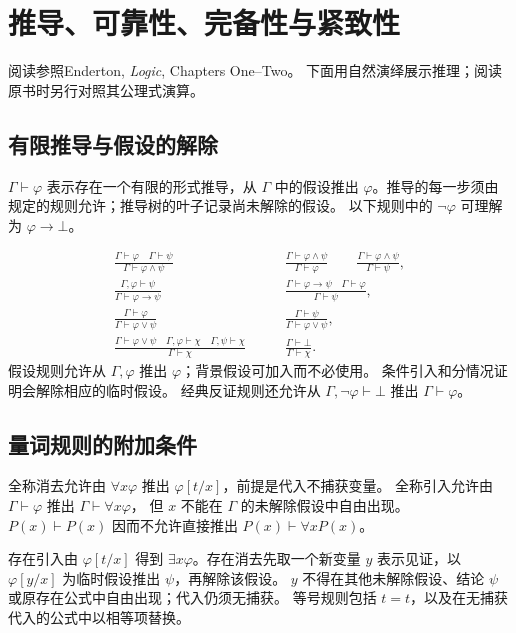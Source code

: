 \chapter{推导、可靠性、完备性与紧致性}
\begin{qlnote}{阅读参照}Enderton, \emph{Logic}, Chapters One--Two。
下面用自然演绎展示推理；阅读原书时另行对照其公理式演算。\end{qlnote}

\section{有限推导与假设的解除}
\(\Gamma\vdash\varphi\) 表示存在一个有限的形式推导，从 \(\Gamma\) 中的假设推出
\(\varphi\)。推导的每一步须由规定的规则允许；推导树的叶子记录尚未解除的假设。
以下规则中的 \(\neg\varphi\) 可理解为 \(\varphi\to\bot\)。

\begin{align*}
\frac{\Gamma\vdash\varphi\quad\Gamma\vdash\psi}{\Gamma\vdash\varphi\land\psi}
&\qquad
\frac{\Gamma\vdash\varphi\land\psi}{\Gamma\vdash\varphi}
\qquad
\frac{\Gamma\vdash\varphi\land\psi}{\Gamma\vdash\psi},\\
\frac{\Gamma,\varphi\vdash\psi}{\Gamma\vdash\varphi\to\psi}
&\qquad
\frac{\Gamma\vdash\varphi\to\psi\quad\Gamma\vdash\varphi}{\Gamma\vdash\psi},\\
\frac{\Gamma\vdash\varphi}{\Gamma\vdash\varphi\lor\psi}
&\qquad
\frac{\Gamma\vdash\psi}{\Gamma\vdash\varphi\lor\psi},\\
\frac{\Gamma\vdash\varphi\lor\psi\quad\Gamma,\varphi\vdash\chi\quad\Gamma,\psi\vdash\chi}
 {\Gamma\vdash\chi}
&\qquad
\frac{\Gamma\vdash\bot}{\Gamma\vdash\chi}.
\end{align*}
假设规则允许从 \(\Gamma,\varphi\) 推出 \(\varphi\)；背景假设可加入而不必使用。
条件引入和分情况证明会解除相应的临时假设。
经典反证规则还允许从 \(\Gamma,\neg\varphi\vdash\bot\) 推出 \(\Gamma\vdash\varphi\)。

\section{量词规则的附加条件}
全称消去允许由 \(\forall x\varphi\) 推出 \(\varphi[t/x]\)，前提是代入不捕获变量。
全称引入允许由 \(\Gamma\vdash\varphi\) 推出 \(\Gamma\vdash\forall x\varphi\)，
但 \(x\) 不能在 \(\Gamma\) 的未解除假设中自由出现。
\(P(x)\vdash P(x)\) 因而不允许直接推出 \(P(x)\vdash\forall xP(x)\)。

存在引入由 \(\varphi[t/x]\) 得到 \(\exists x\varphi\)。存在消去先取一个新变量
\(y\) 表示见证，以 \(\varphi[y/x]\) 为临时假设推出 \(\psi\)，再解除该假设。
\(y\) 不得在其他未解除假设、结论 \(\psi\) 或原存在公式中自由出现；代入仍须无捕获。
等号规则包括 \(t=t\)，以及在无捕获代入的公式中以相等项替换。

